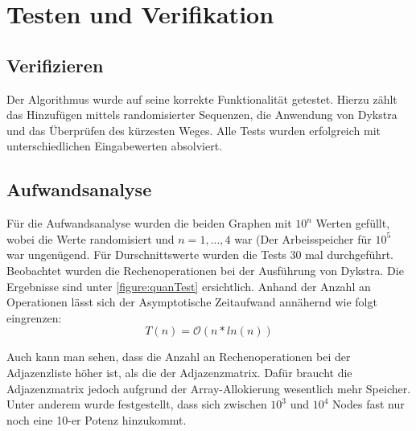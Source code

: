 \documentclass[11pt]{scrartcl}
\begin{document}
		
\section{Testen und Verifikation}
\label{sec:vertests}

	\subsection{Verifizieren}
		\label{sec:veri}
		
		Der Algorithmus wurde auf seine korrekte Funktionalität getestet.
		Hierzu zählt das Hinzufügen mittels randomisierter Sequenzen, die Anwendung von Dykstra und das Überprüfen des kürzesten Weges.
		Alle Tests wurden erfolgreich mit unterschiedlichen Eingabewerten absolviert.
	
	\subsection{Aufwandsanalyse}
		\label{sec:aufwand}
		
		Für die Aufwandsanalyse wurden die beiden Graphen mit $10^n$ Werten gefüllt, wobei die Werte randomisiert und $n=1,...,4$ war (Der Arbeisspeicher für $10^5$ war ungenügend. Für Durschnittswerte wurden die Tests 30 mal durchgeführt.
		Beobachtet wurden die Rechenoperationen bei der Ausführung von Dykstra. Die Ergebnisse sind unter \ref{figure:quanTest} ersichtlich. Anhand der Anzahl an Operationen lässt sich der Asymptotische Zeitaufwand annähernd wie folgt eingrenzen:
		\begin{equation*}
		T(n) = \mathcal{O}(n*ln(n))
		\end{equation*}

		Auch kann man sehen, dass die Anzahl an Rechenoperationen bei der Adjazenzliste höher ist, als die der Adjazenzmatrix. Dafür braucht die Adjazenzmatrix jedoch aufgrund der Array-Allokierung wesentlich mehr Speicher. Unter anderem wurde festgestellt, dass sich zwischen $10^3$ und $10^4$ Nodes fast nur noch eine 10-er Potenz hinzukommt.
\end{document}
